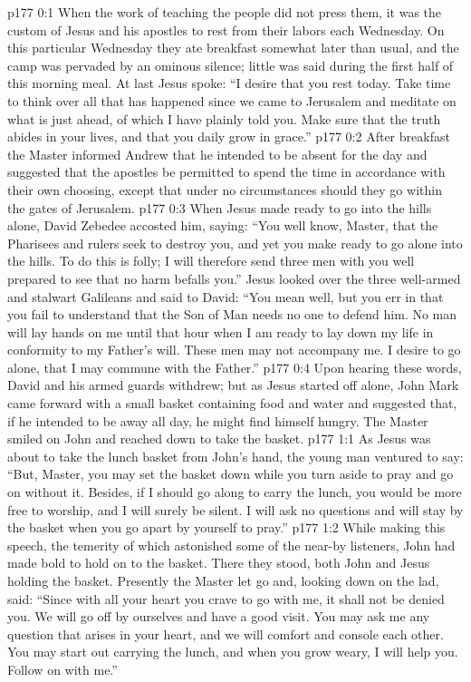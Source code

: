 \author{Midwayer Commission}
\vs p177 0:1 When the work of teaching the people did not press them, it was the custom of Jesus and his apostles to rest from their labors each Wednesday. On this particular Wednesday they ate breakfast somewhat later than usual, and the camp was pervaded by an ominous silence; little was said during the first half of this morning meal. At last Jesus spoke: \textcolor{ubdarkred}{“I desire that you rest today. Take time to think over all that has happened since we came to Jerusalem and meditate on what is just ahead, of which I have plainly told you. Make sure that the truth abides in your lives, and that you daily grow in grace.”}
\vs p177 0:2 After breakfast the Master informed Andrew that he intended to be absent for the day and suggested that the apostles be permitted to spend the time in accordance with their own choosing, except that under no circumstances should they go within the gates of Jerusalem.
\vs p177 0:3 When Jesus made ready to go into the hills alone, David Zebedee accosted him, saying: “You well know, Master, that the Pharisees and rulers seek to destroy you, and yet you make ready to go alone into the hills. To do this is folly; I will therefore send three men with you well prepared to see that no harm befalls you.” Jesus looked over the three well\hyp{}armed and stalwart Galileans and said to David: \textcolor{ubdarkred}{“You mean well, but you err in that you fail to understand that the Son of Man needs no one to defend him. No man will lay hands on me until that hour when I am ready to lay down my life in conformity to my Father’s will. These men may not accompany me. I desire to go alone, that I may commune with the Father.”}
\vs p177 0:4 Upon hearing these words, David and his armed guards withdrew; but as Jesus started off alone, John Mark came forward with a small basket containing food and water and suggested that, if he intended to be away all day, he might find himself hungry. The Master smiled on John and reached down to take the basket.
\vs p177 1:1 As Jesus was about to take the lunch basket from John’s hand, the young man ventured to say: “But, Master, you may set the basket down while you turn aside to pray and go on without it. Besides, if I should go along to carry the lunch, you would be more free to worship, and I will surely be silent. I will ask no questions and will stay by the basket when you go apart by yourself to pray.”
\vs p177 1:2 While making this speech, the temerity of which astonished some of the near\hyp{}by listeners, John had made bold to hold on to the basket. There they stood, both John and Jesus holding the basket. Presently the Master let go and, looking down on the lad, said: \textcolor{ubdarkred}{“Since with all your heart you crave to go with me, it shall not be denied you. We will go off by ourselves and have a good visit. You may ask me any question that arises in your heart, and we will comfort and console each other. You may start out carrying the lunch, and when you grow weary, I will help you. Follow on with me.”}
